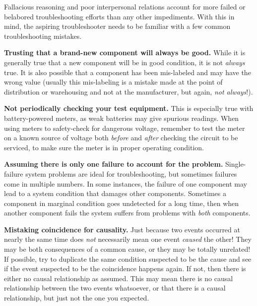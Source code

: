 \stopsubsection

\stopsection

\startsection[title={Potential
Pitfalls},reference={sec:xtocid157909725}]

Fallacious reasoning and poor interpersonal relations account for more
failed or belabored troubleshooting efforts than any other impediments.
With this in mind, the aspiring troubleshooter needs to be familiar with
a few common troubleshooting mistakes.

{\bf Trusting that a brand-new component will always be good.} While it
is generally true that a new component will be in good condition, it is
not {\em always} true. It is also possible that a component has been
mis-labeled and may have the wrong value (usually this mis-labeling is a
mistake made at the point of distribution or warehousing and not at the
manufacturer, but again, {\em not always}!).

{\bf Not periodically checking your test equipment.} This is especially
true with battery-powered meters, as weak batteries may give spurious
readings. When using meters to safety-check for dangerous voltage,
remember to test the meter on a known source of voltage both {\em
before} and {\em after} checking the circuit to be serviced, to make
sure the meter is in proper operating condition.

{\bf Assuming there is only one failure to account for the problem.}
Single-failure system problems are ideal for troubleshooting, but
sometimes failures come in multiple numbers. In some instances, the
failure of one component may lead to a system condition that damages
other components. Sometimes a component in marginal condition goes
undetected for a long time, then when another component fails the system
suffers from problems with {\em both} components.

{\bf Mistaking coincidence for causality.} Just because two events
occurred at nearly the same time does {\em not} necessarily mean one
event {\em caused} the other! They may be both consequences of a common
cause, or they may be totally unrelated! If possible, try to duplicate
the same condition suspected to be the cause and see if the event
suspected to be the coincidence happens again. If not, then there is
either no causal relationship as assumed. This may mean there is no
causal relationship between the two events whatsoever, or that there is
a causal relationship, but just not the one you expected.

